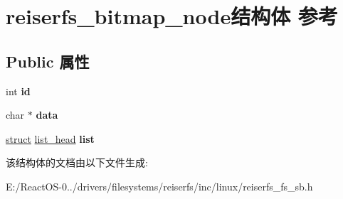\hypertarget{structreiserfs__bitmap__node}{}\section{reiserfs\+\_\+bitmap\+\_\+node结构体 参考}
\label{structreiserfs__bitmap__node}
\subsection*{Public 属性}
\begin{DoxyCompactItemize}
\item 
\mbox{\label{structreiserfs__bitmap__node_a689a4322113b159c2cc837ff37c42499}} 
int {\bfseries id}
\item 
\mbox{\label{structreiserfs__bitmap__node_a3ac1fb902f64a4dbcd9cc6d64b6f8d49}} 
char $\ast$ {\bfseries data}
\item 
\mbox{\label{structreiserfs__bitmap__node_a519cc91cda5cedb9d2bb2b91db3ca7cb}} 
\hyperlink{interfacestruct}{struct} \hyperlink{structlist__head}{list\+\_\+head} {\bfseries list}
\end{DoxyCompactItemize}


该结构体的文档由以下文件生成\+:\begin{DoxyCompactItemize}
\item 
E\+:/\+React\+O\+S-\/0../drivers/filesystems/reiserfs/inc/linux/reiserfs\+\_\+fs\+\_\+sb.\+h\end{DoxyCompactItemize}
